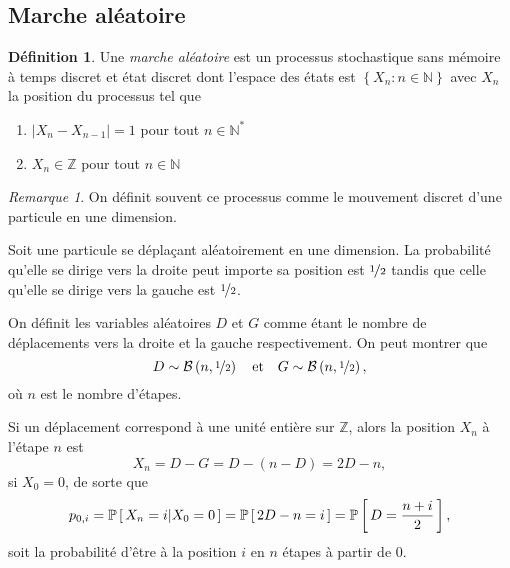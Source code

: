 \documentclass[11pt]{article}
\makeatletter
\renewcommand\P[1]{%
	\ensuremath{%
		\mathbb{P}\left[\,#1\,\right]%
	}%
}%
\newcommand\Pg[2]{%
	\ensuremath{%
		\mathbb{P}\left[\,#1\middle\rvert#2\,\right]%
	}%
}%
\newcommand\Bin[2]{%
	\ensuremath{%
		\mathcal{B}\left(#1,#2\right)%
	}%
}%
\theoremstyle{remark}
\newtheorem*{remark}{Remarque}
\theoremstyle{definition}
\newtheorem*{@definition}{Définition}
\newenvironment{definition}{%
	\begin{@definition}%
}{%
	\end{@definition}%
	\setcounter{property}{0}%
}
\makeatother
\begin{document}
\subsection{Marche aléatoire}
\begin{definition}
	Une \textit{marche aléatoire} est un processus stochastique sans mémoire à
	temps discret et état discret dont l'espace des états est $\left\{X_n:n\in
	\mathbb{N}\right\}$ avec $X_n$ la position du processus tel que
	\begin{enumerate}
		\item $\left\rvert X_{n}-X_{n-1}\right\rvert=1$ pour tout
		      $n\in\mathbb{N}^*$
		\item $X_n\in\mathbb{Z}$ pour tout $n\in\mathbb{N}$
	\end{enumerate}
\end{definition}

\begin{remark}
	On définit souvent ce processus comme le mouvement discret d'une particule
	en une dimension.
\end{remark}

\begin{exemple}
	Soit une particule se déplaçant aléatoirement en une dimension. La
	probabilité qu'elle se dirige vers la droite peut importe sa position est
	$\nicefrac{1}{2}$ tandis que celle qu'elle se dirige vers la gauche est
	$\nicefrac{1}{2}$.

	On définit les variables aléatoires $D$ et $G$ comme étant le nombre de
	déplacements vers la droite et la gauche respectivement. On peut montrer
	que
	\begin{equation*}
		D\sim\Bin{n}{\nicefrac{1}{2}}
		\quad\text{et}\quad
		G\sim\Bin{n}{\nicefrac{1}{2}},
	\end{equation*}
	où $n$ est le nombre d'étapes.
\end{exemple}
\addtocounter{exemple}{-1}
\begin{exemple}[suite]
	Si un déplacement correspond à une unité entière sur $\mathbb{Z}$, alors la
	position $X_n$ à l'étape $n$ est
	\begin{equation*}
		X_n=D-G=D-(n-D)=2D-n,
	\end{equation*}
	si $X_0=0$, de sorte que
	\begin{equation*}
		p_{0,i}
		=\Pg{X_n=i}{X_0=0}
		=\P{2D-n=i}
		=\P{D=\frac{n+i}{2}},
	\end{equation*}
	soit la probabilité d'être à la position $i$ en $n$ étapes à partir de $0$.
\end{exemple}
\end{document}
